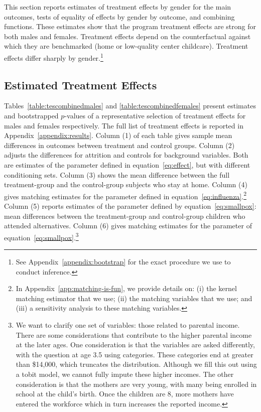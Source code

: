 This section reports estimates of treatment effects by gender for the main outcomes, tests of equality of effects by gender by outcome, and combining functions. These estimates show that the program treatment effects are strong for both males and females. Treatment effects depend on the counterfactual against which they are benchmarked (home or low-quality center childcare). Treatment effects differ sharply by gender.\footnote{See Appendix~\ref{appendix:bootstrap} for the exact procedure we use to conduct inference.}

\subsection{Estimated Treatment Effects}

Tables~\ref{table:tescombinedmales} and \ref{table:tescombinedfemales} present estimates and bootstrapped $p$-values of a representative selection of treatment effects for males and females respectively. The full list of treatment effects is reported in Appendix~\ref{appendix:results}. Column (1) of each table gives sample mean differences in outcomes between treatment and control groups. Column (2) adjusts the differences for attrition and controls for background variables. Both are estimates of the parameter defined in equation~\eqref{eq:effect}, but with different conditioning sets. Column (3) shows the mean difference between the full treatment-group and the control-group subjects who stay at home. Column (4) gives matching estimates for the parameter defined in equation~\eqref{eq:influenza}.\footnote{In Appendix~\ref{app:matching-is-fun}, we provide details on: (i) the kernel matching estimator that we use; (ii) the matching variables that we use; and (iii) a sensitivity analysis to these matching variables.} Column (5) reports estimates of the parameter defined by equation~\eqref{eq:smallpox}: mean differences between the treatment-group and control-group children who attended alternatives. Column (6) gives matching estimates for the parameter of equation~\eqref{eq:smallpox}.\footnote{We want to clarify one set of variables: those related to parental income. There are some considerations that contribute to the higher parental income at the later ages. One consideration is that the variables are asked differently, with the question at age 3.5 using categories. These categories end at greater than \$14,000, which truncates the distribution. Although we fill this out using a tobit model, we cannot fully impute these higher incomes. The other consideration is that the mothers are very young, with many being enrolled in school at the child's birth. Once the children are 8, more mothers have entered the workforce which in turn increases the reported income.}

